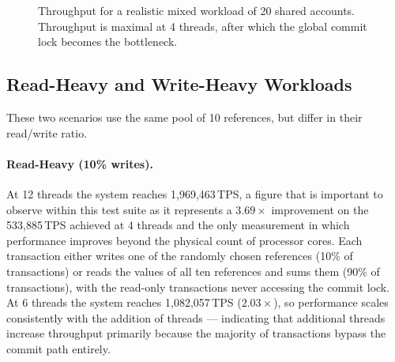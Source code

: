 \begin{figure}[H]
  \centering
  \caption{Throughput for a realistic mixed workload of 20 shared accounts.
    Throughput is maximal at 4 threads, after which the global commit lock
    becomes the bottleneck.}
  \label{fig:throughput-bank-transfer}
\end{figure}

\subsection{Read-Heavy and Write-Heavy Workloads}
\label{sec:read-write-heavy}

These two scenarios use the same pool of 10 references, but differ in
their read/write ratio.

\paragraph{Read-Heavy (10\% writes).}
At 12 threads the system reaches 1,969,463\,TPS, a figure that is
important to observe within this test suite as it represents a
$3.69\times$ improvement on the 533,885\,TPS achieved at 4 threads
and the only measurement in which performance improves beyond the
physical count of processor cores. Each transaction either writes one
of the randomly chosen references (10\% of transactions) or reads the
values of all ten references and sums them (90\% of transactions),
with the read-only transactions never accessing the commit lock. At 6
threads the system reaches 1,082,057\,TPS ($2.03\times$), so
performance scales consistently with the addition of threads ---
indicating that additional threads increase throughput primarily
because the majority of transactions bypass the commit path entirely.

